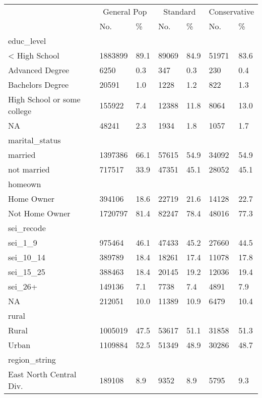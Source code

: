 \captionsetup[table]{labelformat=empty,skip=1pt}
\begin{longtable}{lllllll}
\toprule
 & \multicolumn{2}{c}{General Pop} & \multicolumn{2}{c}{Standard} & \multicolumn{2}{c}{Conservative} \\ 
 \cmidrule(lr){2-3} \cmidrule(lr){4-5} \cmidrule(lr){6-7}
 & No. & \% & No. & \% & No. & \% \\ 
\midrule
\multicolumn{1}{l}{educ\_level} \\ 
\midrule
< High School & 1883899 & 89.1 & 89069 & 84.9 & 51971 & 83.6 \\ 
Advanced Degree & 6250 & 0.3 & 347 & 0.3 & 230 & 0.4 \\ 
Bachelors Degree & 20591 & 1.0 & 1228 & 1.2 & 822 & 1.3 \\ 
High School or some college & 155922 & 7.4 & 12388 & 11.8 & 8064 & 13.0 \\ 
NA & 48241 & 2.3 & 1934 & 1.8 & 1057 & 1.7 \\ 
\midrule
\multicolumn{1}{l}{marital\_status} \\ 
\midrule
married & 1397386 & 66.1 & 57615 & 54.9 & 34092 & 54.9 \\ 
not married & 717517 & 33.9 & 47351 & 45.1 & 28052 & 45.1 \\ 
\midrule
\multicolumn{1}{l}{homeown} \\ 
\midrule
Home Owner & 394106 & 18.6 & 22719 & 21.6 & 14128 & 22.7 \\ 
Not Home Owner & 1720797 & 81.4 & 82247 & 78.4 & 48016 & 77.3 \\ 
\midrule
\multicolumn{1}{l}{sei\_recode} \\ 
\midrule
sei\_1\_9 & 975464 & 46.1 & 47433 & 45.2 & 27660 & 44.5 \\ 
sei\_10\_14 & 389789 & 18.4 & 18261 & 17.4 & 11078 & 17.8 \\ 
sei\_15\_25 & 388463 & 18.4 & 20145 & 19.2 & 12036 & 19.4 \\ 
sei\_26+ & 149136 & 7.1 & 7738 & 7.4 & 4891 & 7.9 \\ 
NA & 212051 & 10.0 & 11389 & 10.9 & 6479 & 10.4 \\ 
\midrule
\multicolumn{1}{l}{rural} \\ 
\midrule
Rural & 1005019 & 47.5 & 53617 & 51.1 & 31858 & 51.3 \\ 
Urban & 1109884 & 52.5 & 51349 & 48.9 & 30286 & 48.7 \\ 
\midrule
\multicolumn{1}{l}{region\_string} \\ 
\midrule
East North Central Div. & 189108 & 8.9 & 9352 & 8.9 & 5795 & 9.3 \\ 

\end{longtable}
